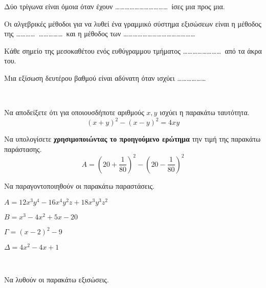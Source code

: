 \documentclass[twoside,nofonts,internet,math,spyros]{frontisthrio-diag}
\begin{document}
\begin{thema}
\begin{erwthma}
\begin{alist}
\item Δύο τρίγωνα είναι όμοια όταν έχουν \ldots\ldots\ldots\ldots\ldots\ldots\ldots\ldots\ldots\ldots\ldots\ ίσες μια προς μια.
\item Οι αλγεβρικές μέθοδοι για να λυθεί ένα γραμμικό σύστημα εξισώσεων είναι η μέθοδος της \ldots\ldots\ldots\ldots\ \ldots\ldots\ldots\ldots\ldots\ και η μέθοδος των \ldots\ldots\ldots\ldots\ldots\ldots\ldots\ldots\ldots\ldots\ldots\ldots\ldots\ldots\ldots
\item Κάθε σημείο της μεσοκαθέτου ενός ευθύγραμμου τμήματος \ldots\ldots\ldots\ldots\ldots\ldots\ldots\ldots\ από τα άκρα του.
\item Μια εξίσωση δευτέρου βαθμού είναι αδύνατη όταν ισχύει \ldots\ldots\ldots\ldots\ldots\ldots
\end{alist}
\end{erwthma}
\item \mbox{}\\\vspace{-5mm}
\begin{erwthma}
\item Να αποδείξετε ότι για οποιουσδήποτε αριθμούς $ x,y $ ισχύει η παρακάτω ταυτότητα.
\[ \left( x+y\right)^2-\left( x-y\right)^2=4xy \]
\item Να υπολογίσετε \textbf{χρησιμοποιώντας το προηγούμενο ερώτημα} την τιμή της παρακάτω παράστασης.
\[ A=\left( 20+\frac{1}{80}\right)^2-\left( 20-\frac{1}{80}\right)^2 \]
\item Να παραγοντοποιηθούν οι παρακάτω παραστάσεις.
\begin{multicols}{2}
\begin{alist}
\item $ A=12x^3y^4-16x^4y^2z+18x^3y^3z^2 $
\item $ B=x^3-4x^2+5x-20 $
\item $ \varGamma=(x-2)^2-9 $
\item $ \varDelta=4x^2-4x+1 $
\end{alist}
\end{multicols}
\end{erwthma}
\item \mbox{}\\\vspace{-5mm}
\begin{erwthma}
\item Να λυθούν οι παρακάτω εξισώσεις.
\begin{multicols}{2}
\begin{alist}

\end{alist}
\end{multicols}
\end{erwthma}
\end{thema}
\end{document}
